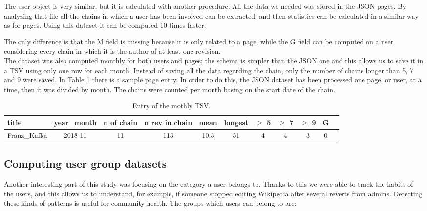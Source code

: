 The user object is very similar, but it is calculated with another procedure. All the data we needed
was stored in the JSON pages. By analyzing that file all the chains in which a user has been
involved can be extracted, and then statistics can be calculated in a similar way as for pages.
Using this dataset it can be computed 10 times faster.  

The only difference is that the M field is missing because it is only related to a page, while the G field
can be computed on a user considering every chain in which it is the author of at least one revision.\\

The dataset was also computed monthly for both users and pages; the schema is simpler than the
JSON one and this allows us to save it in a TSV using only one row for each month. Instead of saving
all the data regarding the chain, only the number of chains longer than 5, 7 and 9 were saved. In
Table \ref{table:chainsPagemonth} there is a sample page entry. In order to do this, the JSON
dataset has been processed one page, or user, at a time, then it was divided by month. The chains
were counted per month basing on the start date of the chain.   

\begin{table}[H]
    \centering
    \begin{tabularx}{\columnwidth}{@{}Xcccccccccc@{}}
        \midrule
        \textbf{title} & \textbf{year\_month} & \textbf{n of chain} & \textbf{n rev in chain} & \textbf{mean} & \textbf{longest} & \textbf{$\geq$ 5} & \textbf{$\geq$ 7} & \textbf{$\geq$ 9} & \textbf{G}\\ \toprule
        Franz\_Kafka & 2018-11 & 11 & 113 & 10.3 & 51 & 4 & 4 & 3 & 0\\
        
        \bottomrule
    \end{tabularx}
    
    \caption{Entry of the mothly TSV. \label{table:chainsPagemonth}}
\end{table}


\subsection{Computing user group datasets}
Another interesting part of this study was focusing on the category a user belongs to. Thanks to this
we were able to track the habits of the users, and this allows us to understand, for example, if
someone stopped editing Wikipedia after several reverts from admins. Detecting these kinds of
patterns is useful for community health. The groups which users can belong to are: 


